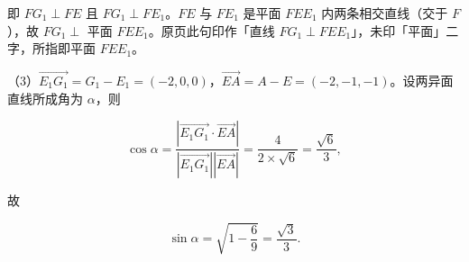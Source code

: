 \begin{answer}
即 $FG_1\perp FE$ 且 $FG_1\perp FE_1$。$FE$ 与 $FE_1$ 是平面 $FEE_1$ 内两条相交直线（交于 $F$），故 $FG_1\perp$ 平面 $FEE_1$。原页此句印作「直线 $FG_1\perp FEE_1$」，未印「平面」二字，所指即平面 $FEE_1$。

（3）$\overrightarrow{E_1G_1}=G_1-E_1=(-2,0,0)$，$\overrightarrow{EA}=A-E=(-2,-1,-1)$。设两异面直线所成角为 $\alpha$，则

\nopagebreak[4]
\[\cos\alpha=\frac{\left|\overrightarrow{E_1G_1}\cdot\overrightarrow{EA}\right|}{\left|\overrightarrow{E_1G_1}\right|\left|\overrightarrow{EA}\right|}=\frac{4}{2\times\sqrt6}=\frac{\sqrt6}{3},\]

故

\nopagebreak[4]
\[\sin\alpha=\sqrt{1-\frac69}=\frac{\sqrt3}{3}.\]


\end{answer}
